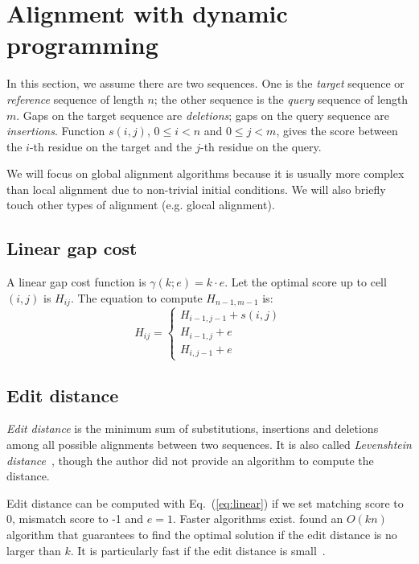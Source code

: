 \documentclass{bioinfo}
\begin{document}
\section{Alignment with dynamic programming}

In this section, we assume there are two sequences. One is the \emph{target}
sequence or \emph{reference} sequence of length $n$; the other sequence is the
\emph{query} sequence of length $m$. Gaps on the target sequence are
\emph{deletions}; gaps on the query sequence are \emph{insertions}. Function
$s(i,j)$, $0\le i<n$ and $0\le j<m$, gives the score between the $i$-th residue
on the target and the $j$-th residue on the query.

We will focus on global alignment algorithms because it is usually more complex
than local alignment due to non-trivial initial conditions. We will also
briefly touch other types of alignment (e.g. glocal alignment).

\subsection{Linear gap cost}

A linear gap cost function is $\gamma(k;e)=k\cdot e$. Let the optimal score up
to cell $(i,j)$ is $H_{ij}$. The equation to compute $H_{n-1,m-1}$ is:
\begin{equation}\label{eq:linear}
H_{ij}=\left\{\begin{array}{l}
H_{i-1,j-1}+s(i,j) \\
H_{i-1,j}+e \\
H_{i,j-1}+e
\end{array}\right.
\end{equation}

\subsection{Edit distance}

\emph{Edit distance} is the minimum sum of substitutions, insertions and
deletions among all possible alignments between two sequences. It is also
called \emph{Levenshtein distance}~\citep{Levenshtein:1966aa}, though the
author did not provide an algorithm to compute the distance.

Edit distance can be computed with Eq.~(\ref{eq:linear}) if we set matching
score to 0, mismatch score to -1 and $e=1$. Faster algorithms exist.
\citet{Landau:1986aa} found an $O(kn)$ algorithm that guarantees to find
the optimal solution if the edit distance is no larger than $k$. It is
particularly fast if the edit distance is small~\citep{Sosic:2015aa}.
\end{document}
